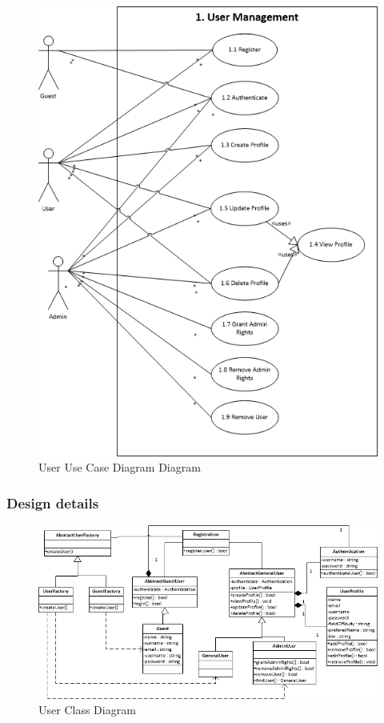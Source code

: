 \documentclass{article}
\begin{document}
	\begin{figure}[h!]
      \includegraphics[width=\textwidth]{User/img/User_Subsystem_Use_Case_Diagram.png}
      \caption{User Use Case Diagram Diagram}
    \end{figure}

	\clearpage
	
\subsubsection{Design details}

	\begin{figure}[h!]
      \includegraphics[width=\textwidth]{User/img/User_Subsystem_Class_Diagram.png}
      \caption{User Class Diagram}
    \end{figure}
    
\end{document}
